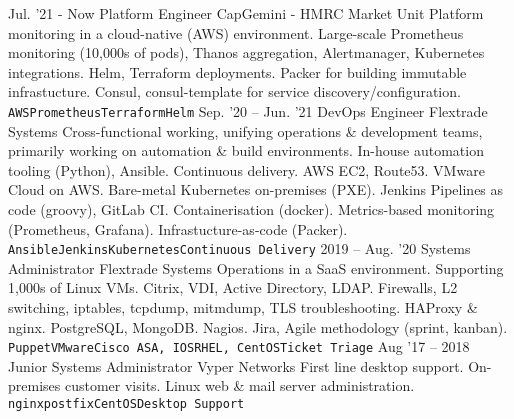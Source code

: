 \documentclass[10pt]{developercv} %
\begin{document}
\vspace{0.5cm}


\begin{entrylist}
  \entry
    {Jul. '21 - Now}
    {Platform Engineer}
    {CapGemini - HMRC Market Unit}
    {Platform monitoring in a cloud-native (AWS) environment. Large-scale Prometheus monitoring (10,000s of pods), Thanos aggregation, Alertmanager, Kubernetes \linebreak integrations. Helm, Terraform deployments. Packer for building immutable \linebreak infrastucture. Consul, consul-template for service discovery/configuration.\\ \texttt{AWS}\slashsep\texttt{Prometheus}\slashsep\texttt{Terraform}\slashsep\texttt{Helm}}
	\entry
		{Sep. '20 -- Jun. '21}
		{DevOps Engineer}
		{Flextrade Systems}
    {Cross-functional working, unifying operations \& development teams, primarily working on automation \& build environments. In-house automation tooling (Python), \linebreak Ansible. Continuous delivery. AWS EC2, Route53. VMware Cloud on AWS. Bare-metal \linebreak Kubernetes on-premises (PXE). Jenkins Pipelines as code (groovy), GitLab CI. \linebreak Containerisation (docker). Metrics-based monitoring (Prometheus, Grafana). Infrastucture-as-code (Packer).\\ \texttt{Ansible}\slashsep\texttt{Jenkins}\slashsep\texttt{Kubernetes}\slashsep\texttt{Continuous Delivery}}
	\entry
		{2019 -- Aug. '20}
		{Systems Administrator}
		{Flextrade Systems}
    {Operations in a SaaS environment. Supporting 1,000s of Linux VMs. Citrix, VDI, \linebreak Active Directory, LDAP. Firewalls, L2 switching, iptables, tcpdump, mitmdump, \linebreak TLS troubleshooting. HAProxy \& nginx. PostgreSQL, MongoDB. Nagios. Jira, Agile methodology (sprint, kanban).\\ \texttt{Puppet}\slashsep\texttt{VMware}\slashsep\texttt{Cisco ASA, IOS}\slashsep\texttt{RHEL, CentOS}\slashsep\texttt{Ticket Triage}}
	\entry
		{Aug '17 -- 2018}
		{Junior Systems Administrator}
		{Vyper Networks}
    {First line desktop support. On-premises customer visits. Linux web \& mail server administration.\\ \texttt{nginx}\slashsep\texttt{postfix}\slashsep\texttt{CentOS}\slashsep\texttt{Desktop Support}}
\end{entrylist}
\end{document}
